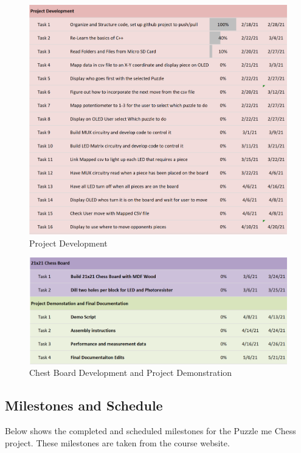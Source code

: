 \documentclass[11pt]{article}
\begin{document}
\begin{figure}
  \includegraphics[width=\linewidth]{./Pics/Project_Development.PNG}
  \caption{Project Development}
  \label{fig:PD}
\end{figure}


\begin{figure}
  \includegraphics[width=\linewidth]{./Pics/Chess_Board_Project Demostation_Gnatt.PNG}
  \caption{Chest Board Development and Project Demonstration}
  \label{fig:CBPD}
\end{figure}

\subsection{Milestones and Schedule}
Below shows the completed and scheduled milestones for the Puzzle me Chess project. These milestones are taken from the course website.  
\end{document}
